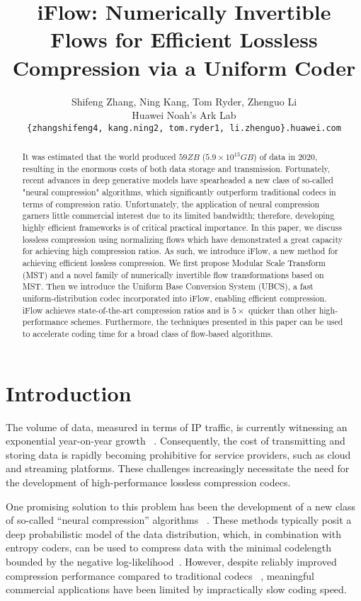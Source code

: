 \documentclass{article}
\title{iFlow: Numerically Invertible Flows for Efficient Lossless Compression via a Uniform Coder}
\author{Shifeng Zhang, Ning Kang, Tom Ryder, Zhenguo Li \\
  Huawei Noah's Ark Lab\\
  \texttt{\{zhangshifeng4, kang.ning2, tom.ryder1, li.zhenguo\}.huawei.com} \\
}
\begin{document}
\maketitle

\begin{abstract}
It was estimated that the world produced $59 ZB$ ($5.9 \times 10^{13} GB$) of data in 2020,
resulting in the enormous costs of both data storage and transmission.
Fortunately, recent advances in deep generative models have spearheaded a new class of so-called "neural compression" algorithms, which significantly outperform traditional codecs in terms of compression ratio.
Unfortunately, the application of neural compression garners little commercial interest due to its limited bandwidth; therefore, developing highly efficient frameworks is of critical practical importance. In this paper, we discuss lossless compression using normalizing flows which have demonstrated a great capacity for achieving high compression ratios.
As such, we introduce iFlow, a new method for achieving efficient lossless compression. 
We first propose Modular Scale Transform (MST) and a novel family of numerically invertible flow transformations based on MST. Then we introduce the Uniform Base Conversion System (UBCS), a fast uniform-distribution codec incorporated into iFlow, enabling efficient compression. 
iFlow achieves state-of-the-art compression ratios and is $5 \times$ quicker than other high-performance schemes. Furthermore, the techniques presented in this paper can be used to accelerate coding time for a broad class of flow-based algorithms. 
\end{abstract}

\section{Introduction}

The volume of data, measured in terms of IP traffic, is currently witnessing an exponential year-on-year growth ~\cite{forecast2019cisco}. Consequently, the cost of transmitting and storing data is rapidly becoming prohibitive for service providers, such as cloud and streaming platforms. These challenges increasingly necessitate the need for the development of high-performance lossless compression codecs.

One promising solution to this problem has been the development of a new class of so-called “neural compression” algorithms ~\cite{mentzer2019practical,townsend2019practical,hoogeboom2019integer,berg2020idf++,ho2019compression,townsend2019hilloc,kingma2019bit,mentzer2020learning,cao2020lossless,zhang2021ivpf}. 
These methods typically posit a deep probabilistic model of the data distribution, which, in combination with entropy coders, can be used to compress data with the minimal codelength bounded by the negative log-likelihood~\cite{mackay2003information}.
However, despite reliably improved compression performance compared to traditional codecs ~\cite{gage1994new,rabbani2002jpeg2000,collet2016smaller,roelofs1999png}, meaningful commercial applications have been limited by impractically slow coding speed.
\end{document}
